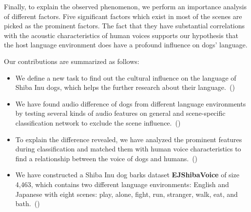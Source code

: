 Finally, to explain the observed phenomenon, we perform an importance analysis of different factors. Five significant factors which exist in most of the scenes are picked as the prominent factors. The fact that they have substantial correlations with the acoustic characteristics of human voices supports our hypothesis that the host language environment does have a profound influence on dogs' language.

Our contributions are summarized as follows:
\begin{itemize}
    \item We define a new task to find out the cultural influence on the language of Shiba Inu dogs, which helps the further research about their language.~()
	\item We have found audio difference of dogs from different language environments by testing several kinds of audio features on general and scene-specific classification network to exclude the scene influence.~()
	\item To explain the difference revealed, we have analyzed the prominent features during classification and matched them with human voice characteristics to find a relationship between the voice of dogs and humans.~()
	\item We have constructed a Shiba Inu dog barks dataset \textbf{EJShibaVoice} of size 4,463, which contains two different language environments: English and Japanese with eight scenes: play, alone, fight, run, stranger, walk, eat, and bath.~()
\end{itemize}
